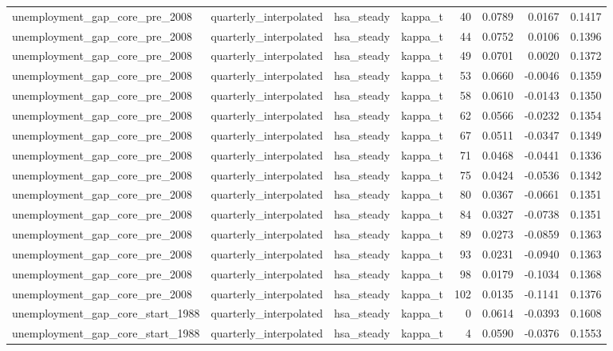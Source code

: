 \begin{tabular}{llllrrrr}
unemployment\_gap\_core\_pre\_2008 & quarterly\_interpolated & hsa\_steady & kappa\_t & 40 & 0.0789 & 0.0167 & 0.1417 \\
unemployment\_gap\_core\_pre\_2008 & quarterly\_interpolated & hsa\_steady & kappa\_t & 44 & 0.0752 & 0.0106 & 0.1396 \\
unemployment\_gap\_core\_pre\_2008 & quarterly\_interpolated & hsa\_steady & kappa\_t & 49 & 0.0701 & 0.0020 & 0.1372 \\
unemployment\_gap\_core\_pre\_2008 & quarterly\_interpolated & hsa\_steady & kappa\_t & 53 & 0.0660 & -0.0046 & 0.1359 \\
unemployment\_gap\_core\_pre\_2008 & quarterly\_interpolated & hsa\_steady & kappa\_t & 58 & 0.0610 & -0.0143 & 0.1350 \\
unemployment\_gap\_core\_pre\_2008 & quarterly\_interpolated & hsa\_steady & kappa\_t & 62 & 0.0566 & -0.0232 & 0.1354 \\
unemployment\_gap\_core\_pre\_2008 & quarterly\_interpolated & hsa\_steady & kappa\_t & 67 & 0.0511 & -0.0347 & 0.1349 \\
unemployment\_gap\_core\_pre\_2008 & quarterly\_interpolated & hsa\_steady & kappa\_t & 71 & 0.0468 & -0.0441 & 0.1336 \\
unemployment\_gap\_core\_pre\_2008 & quarterly\_interpolated & hsa\_steady & kappa\_t & 75 & 0.0424 & -0.0536 & 0.1342 \\
unemployment\_gap\_core\_pre\_2008 & quarterly\_interpolated & hsa\_steady & kappa\_t & 80 & 0.0367 & -0.0661 & 0.1351 \\
unemployment\_gap\_core\_pre\_2008 & quarterly\_interpolated & hsa\_steady & kappa\_t & 84 & 0.0327 & -0.0738 & 0.1351 \\
unemployment\_gap\_core\_pre\_2008 & quarterly\_interpolated & hsa\_steady & kappa\_t & 89 & 0.0273 & -0.0859 & 0.1363 \\
unemployment\_gap\_core\_pre\_2008 & quarterly\_interpolated & hsa\_steady & kappa\_t & 93 & 0.0231 & -0.0940 & 0.1363 \\
unemployment\_gap\_core\_pre\_2008 & quarterly\_interpolated & hsa\_steady & kappa\_t & 98 & 0.0179 & -0.1034 & 0.1368 \\
unemployment\_gap\_core\_pre\_2008 & quarterly\_interpolated & hsa\_steady & kappa\_t & 102 & 0.0135 & -0.1141 & 0.1376 \\
unemployment\_gap\_core\_start\_1988 & quarterly\_interpolated & hsa\_steady & kappa\_t & 0 & 0.0614 & -0.0393 & 0.1608 \\
unemployment\_gap\_core\_start\_1988 & quarterly\_interpolated & hsa\_steady & kappa\_t & 4 & 0.0590 & -0.0376 & 0.1553 \\

\end{tabular}
